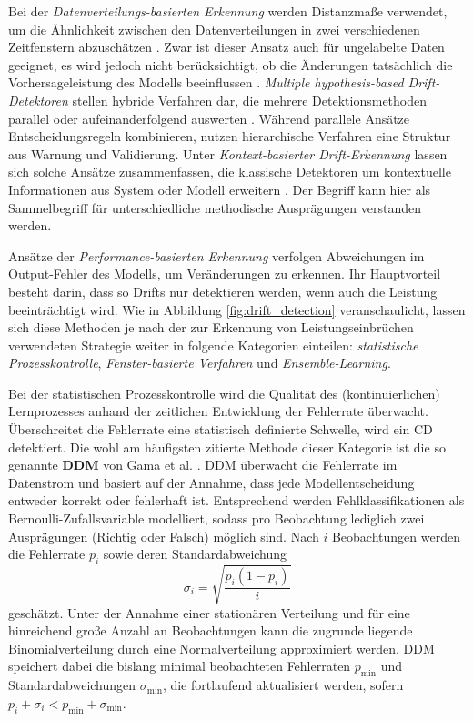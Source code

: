 Bei der \emph{Datenverteilungs-basierten Erkennung} werden Distanzmaße verwendet, um die Ähnlichkeit zwischen den Datenverteilungen in zwei verschiedenen Zeitfenstern abzuschätzen \cite{kifer.2004}. Zwar ist dieser Ansatz auch für ungelabelte Daten geeignet, es wird jedoch nicht berücksichtigt, ob die Änderungen tatsächlich die Vorhersageleistung des Modells beeinflussen \cite{gama.2014}.
\emph{Multiple hypothesis-based Drift-Detektoren} stellen hybride Verfahren dar, die mehrere Detektionsmethoden parallel oder aufeinanderfolgend auswerten \cite{lu.2018}. Während parallele Ansätze Entscheidungsregeln kombinieren, nutzen hierarchische Verfahren eine Struktur aus Warnung und Validierung. 
Unter \emph{Kontext-basierter Drift-Erkennung} lassen sich solche Ansätze zusammenfassen, die klassische Detektoren um kontextuelle Informationen aus System oder Modell erweitern \cite{bayram.2022}. Der Begriff kann hier als Sammelbegriff für unterschiedliche methodische Ausprägungen verstanden werden. \par
Ansätze der \emph{Performance-basierten Erkennung} verfolgen Abweichungen im Output-Fehler des Modells, um Veränderungen zu erkennen. Ihr Hauptvorteil besteht darin, dass so Drifts nur detektieren werden, wenn auch die Leistung beeinträchtigt wird. Wie in Abbildung \ref{fig:drift_detection} veranschaulicht, lassen sich diese Methoden je nach der zur Erkennung von Leistungseinbrüchen verwendeten Strategie weiter in folgende Kategorien einteilen: \emph{statistische Prozesskontrolle}, \emph{Fenster-basierte Verfahren} und \emph{Ensemble-Learning}. \par
Bei der statistischen Prozesskontrolle wird die Qualität des (kontinuierlichen) Lernprozesses anhand der zeitlichen Entwicklung der Fehlerrate überwacht. Überschreitet die Fehlerrate eine statistisch definierte Schwelle, wird ein \ac{CD} detektiert.
Die wohl am häufigsten zitierte Methode dieser Kategorie ist die so genannte \textbf{\ac{DDM}} von Gama et al. \cite{gama.2004}. 
\ac{DDM} überwacht die Fehlerrate im Datenstrom und basiert auf der Annahme, dass jede Modellentscheidung entweder korrekt oder fehlerhaft ist. Entsprechend werden Fehlklassifikationen als Bernoulli-Zufallsvariable modelliert, sodass pro Beobachtung lediglich zwei Ausprägungen (Richtig oder Falsch) möglich sind. 
Nach $i$ Beobachtungen werden die Fehlerrate $p_i$ sowie deren Standardabweichung 
%
\begin{equation} \label{eq:std_ddm}
    \sigma_i = \sqrt{\frac{p_i(1-p_i)}{i}}
\end{equation}
%
geschätzt. Unter der Annahme einer stationären Verteilung und für eine hinreichend große Anzahl an Beobachtungen kann die zugrunde liegende Binomialverteilung durch eine Normalverteilung approximiert werden. \ac{DDM} speichert dabei die bislang minimal beobachteten Fehlerraten $p_{\mathrm{min}}$ und Standardabweichungen $\sigma_{\mathrm{min}}$, die fortlaufend aktualisiert werden, sofern $p_i+\sigma_i < p_{\mathrm{min}} + \sigma_{\mathrm{min}}$.
